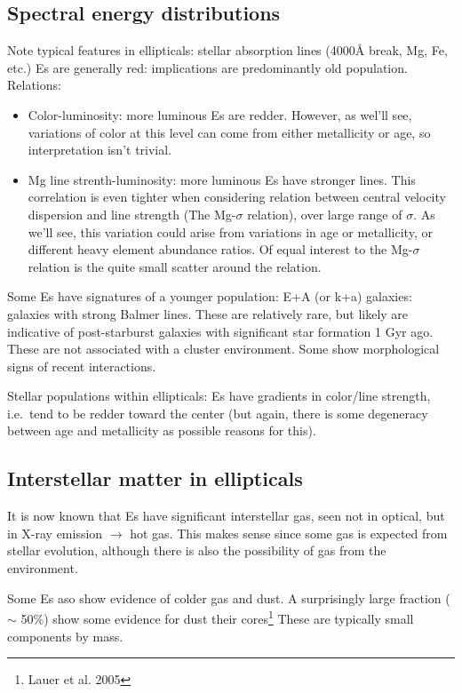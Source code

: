 \documentclass{article}
\begin{document}
\subsection{Spectral energy distributions}
Note typical features in ellipticals: stellar absorption lines
(4000\AA{} break, Mg, Fe, etc.)
Es are generally red: implications are predominantly old population.
Relations:
\begin{itemize}
    \item Color-luminosity: more luminous Es are redder. However, as wel'll
        see, variations of color at this level can come from either metallicity
        or age, so interpretation isn't trivial.
    \item Mg line strenth-luminosity: more luminous Es have stronger lines.
        This correlation is even tighter when considering relation between
        central velocity dispersion and line strength (The Mg-$\sigma$ relation),
        over large range of $\sigma$. As we'll see, this variation could
        arise from variations in age or metallicity, or different heavy element
        abundance ratios. Of equal interest to the Mg-$\sigma$ relation is the
        quite small scatter around the relation.
  \end{itemize}
Some Es have signatures of a younger population: E+A (or k+a) galaxies:
galaxies with strong Balmer lines. These are relatively rare, but likely
are indicative of post-starburst galaxies with significant star formation
1 Gyr ago. These are not associated with a cluster environment. Some show
morphological signs of recent interactions.

Stellar populations within ellipticals: Es have gradients in color/line
strength, i.e.\ tend to be redder toward the center (but again, there is
some degeneracy between age and metallicity as possible reasons for this).

\subsection{Interstellar matter in ellipticals}
It is now known that Es have significant interstellar gas, seen not in
optical, but in X-ray emission $\rightarrow$ hot gas.
This makes sense since some gas is expected from stellar evolution,
although there is also the possibility of gas from the environment.

Some Es aso show evidence of colder gas and dust.  A surprisingly large
fraction ($\sim$ 50\%) show some evidence for dust their cores\footnote{Lauer
et al. 2005} These are typically small components by mass.
\end{document}
